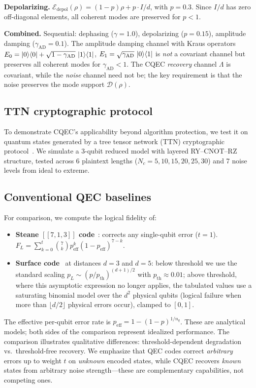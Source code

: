 \documentclass[pra,twocolumn,superscriptaddress,longbibliography,floatfix]{revtex4-2}
\begin{document}
\textbf{Depolarizing.}
$\mathcal{E}_\mathrm{depol}(\rho) = (1-p)\rho + p \cdot I/d$, with $p = 0.3$.
Since $I/d$ has zero off-diagonal elements, all coherent modes are preserved for $p < 1$.

\textbf{Combined.}
Sequential: dephasing ($\gamma = 1.0$), depolarizing ($p = 0.15$), amplitude damping ($\gamma_\mathrm{AD} = 0.1$).
The amplitude damping channel with Kraus operators $E_0 = \ket{0}\!\bra{0} + \sqrt{1-\gamma_\mathrm{AD}}\,\ket{1}\!\bra{1}$, $E_1 = \sqrt{\gamma_\mathrm{AD}}\,\ket{0}\!\bra{1}$ is \emph{not} a covariant channel but preserves all coherent modes for $\gamma_\mathrm{AD} < 1$.
The CQEC \emph{recovery} channel $\Lambda$ is covariant, while the \emph{noise} channel need not be; the key requirement is that the noise preserves the mode support $\mathcal{D}(\rho)$.


\subsection{TTN cryptographic protocol}
\label{sec:ttn}

To demonstrate CQEC's applicability beyond algorithm protection, we test it on quantum states generated by a tree tensor network (TTN) cryptographic protocol~\cite{Huggins2019,Sim2019}.
We simulate a 3-qubit reduced model with layered RY--CNOT--RZ structure, tested across 6 plaintext lengths ($N_c = 5, 10, 15, 20, 25, 30$) and 7 noise levels from ideal to extreme.


\subsection{Conventional QEC baselines}
\label{sec:qec_baselines}

For comparison, we compute the logical fidelity of:
\begin{itemize}
\item \textbf{Steane $[\![7,1,3]\!]$ code}~\cite{Steane1996}: corrects any single-qubit error ($t = 1$). $F_L = \sum_{k=0}^{t} \binom{7}{k} p_\mathrm{eff}^k (1-p_\mathrm{eff})^{7-k}$.
\item \textbf{Surface code}~\cite{Kitaev2003,Fowler2012} at distances $d = 3$ and $d = 5$: below threshold we use the standard scaling $p_L \sim (p/p_\mathrm{th})^{(d+1)/2}$ with $p_\mathrm{th} \approx 0.01$; above threshold, where this asymptotic expression no longer applies, the tabulated values use a saturating binomial model over the $d^2$ physical qubits (logical failure when more than $\lfloor d/2 \rfloor$ physical errors occur), clamped to $[0, 1]$.
\end{itemize}
The effective per-qubit error rate is $p_\mathrm{eff} = 1 - (1-p)^{1/n_q}$.
These are analytical models; both sides of the comparison represent idealized performance.
The comparison illustrates qualitative differences: threshold-dependent degradation vs.\ threshold-free recovery.
We emphasize that QEC codes correct \emph{arbitrary} errors up to weight $t$ on \emph{unknown} encoded states, while CQEC recovers \emph{known} states from arbitrary noise strength---these are complementary capabilities, not competing ones.
\end{document}
